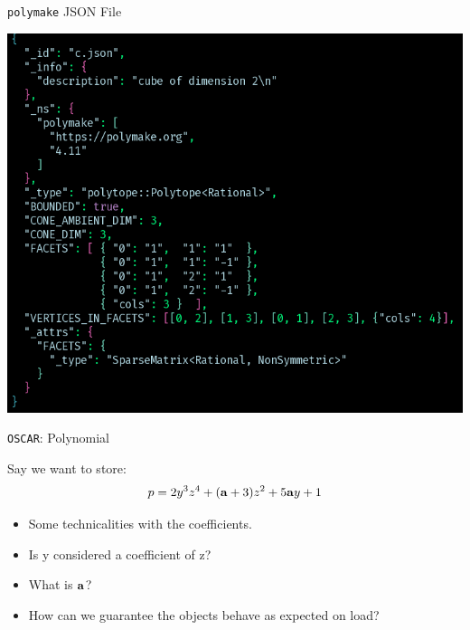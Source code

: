 \documentclass[9pt]{beamer}
\newcommand\oscar{\texttt{OSCAR}\xspace}
\theoremstyle{definition}
\begin{document}
\begin{frame}[fragile]{\texttt{polymake} JSON File}
  \begin{center}
    \includegraphics[height=0.8\textheight]{images/pm-json}
  \end{center}
\end{frame}

\begin{frame}[fragile]{ \oscar: Polynomial }

  Say we want to store:
  \begin{align*}
    p = 2y^3z^4 + (\bold{a} + 3)z^2 + 5\bold{a}y + 1
  \end{align*} \pause

  \begin{itemize}
  \item Some technicalities with the coefficients.
  \item Is y considered a coefficient of z?
  \item What is $\bold{a}$?
  \item How can we guarantee the objects behave as expected on load?
  \end{itemize}
\end{frame}
\end{document}
